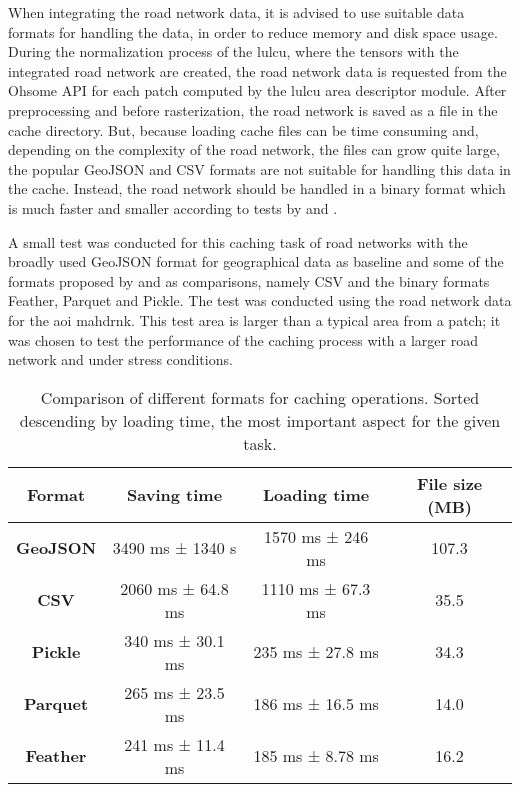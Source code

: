 When integrating the road network data, it is advised to use suitable data formats for handling the data, in order to reduce memory and disk space usage. During the normalization process of the \gls{lulcu}, where the tensors with the integrated road network are created, the road network data is requested from the Ohsome API for each patch computed by the \gls{lulcu} area descriptor module. After preprocessing and before rasterization, the road network is saved as a file in the cache directory. But, because loading cache files can be time consuming and, depending on the complexity of the road network, the files can grow quite large, the popular GeoJSON and CSV formats are not suitable for handling this data in the cache. Instead, the road network should be handled in a binary format which is much faster and smaller according to tests by \textcite{Zaitsev2019} and \textcite{Rangaraj.ShobanaDevi.ea2022}.

A small test was conducted for this caching task of road networks with the broadly used GeoJSON format for geographical data as baseline and some of the formats proposed by \textcite{Zaitsev2019} and \textcite{Rangaraj.ShobanaDevi.ea2022} as comparisons, namely CSV and the binary formats Feather, Parquet and Pickle. The test was conducted using the road network data for the \gls{aoi} \gls{mahdrnk}. This test area is larger than a typical area from a patch; it was chosen to test the performance of the caching process with a larger road network and under stress conditions.

\begin{table}[htb]
    \centering
    \caption[File Caching Format Comparison]{Comparison of different formats for caching operations. Sorted descending by loading time, the most important aspect for the given task.}
    \begin{tabular}{cccc}
        \toprule
        \textbf{Format} & \textbf{Saving time} & \textbf{Loading time} & \textbf{File size (MB)} \\
        \midrule
        \textbf{GeoJSON} & 3490 ms ± 1340 s & 1570 ms ± 246 ms & 107.3 \\
        \textbf{CSV} & 2060 ms ± 64.8 ms & 1110 ms ± 67.3 ms & 35.5 \\
        \textbf{Pickle} & 340 ms ± 30.1 ms & 235 ms ± 27.8 ms & 34.3 \\
        \textbf{Parquet} & 265 ms ± 23.5 ms & 186 ms ± 16.5 ms & 14.0 \\
        \textbf{Feather} & 241 ms ± 11.4 ms & 185 ms ± 8.78 ms & 16.2 \\
        \bottomrule
    \end{tabular}
    \label{tab:formatcomparison}    
\end{table}

